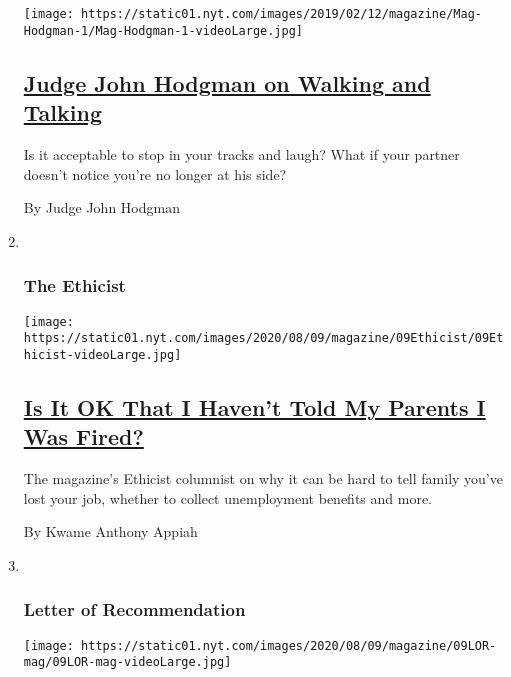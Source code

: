 \begin{enumerate}
  \texttt{[image: https://static01.nyt.com/images/2019/02/12/magazine/Mag-Hodgman-1/Mag-Hodgman-1-videoLarge.jpg]}

  \hypertarget{judge-john-hodgman-on-walking-and-talking}{%
  \subsection{\texorpdfstring{\href{/2020/08/06/magazine/judge-john-hodgman-on-walking-and-talking.html}{Judge
  John Hodgman on Walking and
  Talking}}{Judge John Hodgman on Walking and Talking}}\label{judge-john-hodgman-on-walking-and-talking}}

  Is it acceptable to stop in your tracks and laugh? What if your
  partner doesn't notice you're no longer at his side?

  By Judge John Hodgman
\item ~
  \hypertarget{the-ethicist}{%
  \subsubsection{The Ethicist}\label{the-ethicist}}

  \texttt{[image: https://static01.nyt.com/images/2020/08/09/magazine/09Ethicist/09Ethicist-videoLarge.jpg]}

  \hypertarget{is-it-ok-that-i-havent-told-my-parents-i-was-fired}{%
  \subsection{\texorpdfstring{\href{/2020/08/04/magazine/jobs-unemployment-ethics.html}{Is
  It OK That I Haven't Told My Parents I Was
  Fired?}}{Is It OK That I Haven't Told My Parents I Was Fired?}}\label{is-it-ok-that-i-havent-told-my-parents-i-was-fired}}

  The magazine's Ethicist columnist on why it can be hard to tell family
  you've lost your job, whether to collect unemployment benefits and
  more.

  By Kwame Anthony Appiah
\item ~
  \hypertarget{letter-of-recommendation}{%
  \subsubsection{Letter of
  Recommendation}\label{letter-of-recommendation}}

  \texttt{[image: https://static01.nyt.com/images/2020/08/09/magazine/09LOR-mag/09LOR-mag-videoLarge.jpg]}

  \hypertarget{fly-casting-on-city-streets-is-weird-thats-why-i-love-it}{%
}
\end{enumerate}
